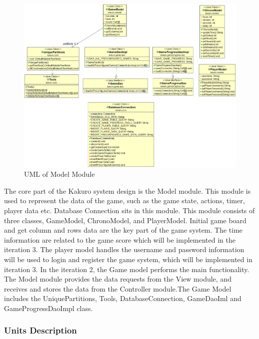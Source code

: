 \documentclass[12pt]{article}
\begin{document}
\begin{figure}[htbp]
    \includegraphics[width=1\textwidth]{images/Model_UML.png}
    \caption{UML of Model Module}
    \label{fig:Model_UML}
\end{figure}

The core part of the Kakuro system design is the Model module. This module is used to represent the data of the game, such as the game state, actions, timer, player data etc. Database Connection sits in this module. This module consists of three classes, GameModel, ChronoModel, and PlayerModel. Initial game board and get column and rows data are the key part of the game system. The time information are related to the game score which will be implemented in the iteration 3. The player model handles the username and password information will be used to login and register the game system, which will be implemented in iteration 3. In the iteration 2, the Game model performs the main functionality. The Model module provides the data requests from the View module, and receives and stores the data from the Controller module.The Game Model includes the UniquePartitions, Tools, DatabaseConnection, GameDaoIml and GameProgressDaoImpl class.

\newpage

\subsubsection{Units Description}
\end{document}
